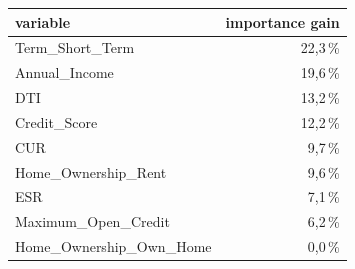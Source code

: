 \begin{tabular}{lr}
\toprule
\textbf{variable} & \textbf{importance gain} \\
\midrule
Term\_Short\_Term & 22,3\,\% \\
Annual\_Income & 19,6\,\% \\
DTI & 13,2\,\% \\
Credit\_Score & 12,2\,\% \\
CUR & 9,7\,\% \\
Home\_Ownership\_Rent & 9,6\,\% \\
ESR & 7,1\,\% \\
Maximum\_Open\_Credit & 6,2\,\% \\
Home\_Ownership\_Own\_Home & 0,0\,\% \\
\bottomrule
\end{tabular}
